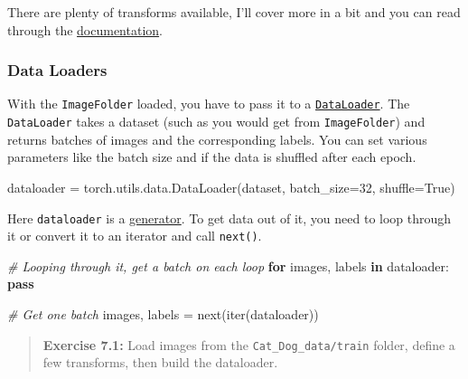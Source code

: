 \documentclass[11pt]{article}
\newenvironment{Shaded}{}{}
\newcommand{\KeywordTok}[1]{\textcolor[rgb]{0.00,0.44,0.13}{\textbf{{#1}}}}
\newcommand{\DecValTok}[1]{\textcolor[rgb]{0.25,0.63,0.44}{{#1}}}
\newcommand{\CommentTok}[1]{\textcolor[rgb]{0.38,0.63,0.69}{\textit{{#1}}}}
\newcommand{\NormalTok}[1]{{#1}}
\newcommand{\VariableTok}[1]{\textcolor[rgb]{0.10,0.09,0.49}{{#1}}}
\newcommand{\ControlFlowTok}[1]{\textcolor[rgb]{0.00,0.44,0.13}{\textbf{{#1}}}}
\newcommand{\OperatorTok}[1]{\textcolor[rgb]{0.40,0.40,0.40}{{#1}}}
\newcommand{\BuiltInTok}[1]{{#1}}
\begin{document}
There are plenty of transforms available, I'll cover more in a bit and
you can read through the
\href{http://pytorch.org/docs/master/torchvision/transforms.html}{documentation}.

\hypertarget{data-loaders}{%
\subsubsection{Data Loaders}\label{data-loaders}}

With the \texttt{ImageFolder} loaded, you have to pass it to a
\href{http://pytorch.org/docs/master/data.html\#torch.utils.data.DataLoader}{\texttt{DataLoader}}.
The \texttt{DataLoader} takes a dataset (such as you would get from
\texttt{ImageFolder}) and returns batches of images and the
corresponding labels. You can set various parameters like the batch size
and if the data is shuffled after each epoch.

\begin{Shaded}
\begin{Highlighting}[]
\NormalTok{dataloader }\OperatorTok{=}\NormalTok{ torch.utils.data.DataLoader(dataset, batch_size}\OperatorTok{=}\DecValTok{32}\NormalTok{, shuffle}\OperatorTok{=}\VariableTok{True}\NormalTok{)}
\end{Highlighting}
\end{Shaded}

Here \texttt{dataloader} is a
\href{https://jeffknupp.com/blog/2013/04/07/improve-your-python-yield-and-generators-explained/}{generator}.
To get data out of it, you need to loop through it or convert it to an
iterator and call \texttt{next()}.

\begin{Shaded}
\begin{Highlighting}[]
\CommentTok{# Looping through it, get a batch on each loop }
\ControlFlowTok{for}\NormalTok{ images, labels }\KeywordTok{in}\NormalTok{ dataloader:}
    \ControlFlowTok{pass}

\CommentTok{# Get one batch}
\NormalTok{images, labels }\OperatorTok{=} \BuiltInTok{next}\NormalTok{(}\BuiltInTok{iter}\NormalTok{(dataloader))}
\end{Highlighting}
\end{Shaded}

\begin{quote}
\textbf{Exercise 7.1:} Load images from the
\texttt{Cat\_Dog\_data/train} folder, define a few transforms, then
build the dataloader.
\end{quote}
\end{document}

